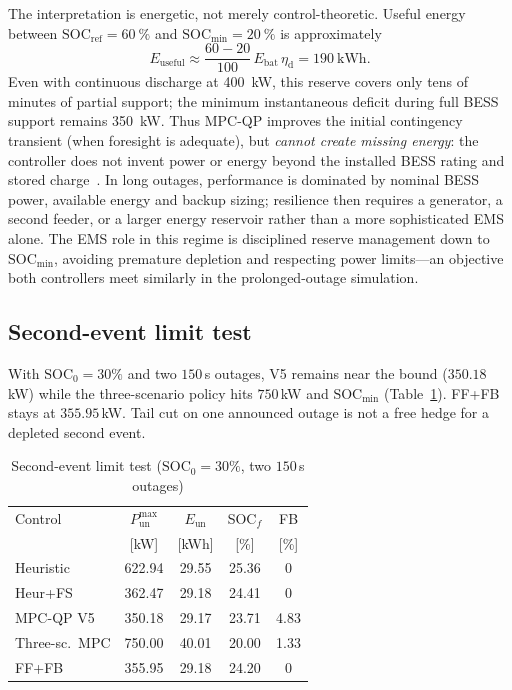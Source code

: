 \documentclass{ieeeaccess}
\begin{document}
The interpretation is energetic, not merely control-theoretic. Useful energy between $\mathrm{SOC}_{\mathrm{ref}}=\SI{60}{\percent}$ and $\mathrm{SOC}_{\min}=\SI{20}{\percent}$ is approximately
\begin{equation}
E_{\mathrm{useful}}\approx\frac{60-20}{100}\,E_{\mathrm{bat}}\,\eta_{\mathrm{d}}
=\SI{190}{\kilo\watt\hour}.
\end{equation}
Even with continuous discharge at \SI{400}{\kilo\watt}, this reserve covers only tens of minutes of partial support; the minimum instantaneous deficit during full BESS support remains \SI{350}{\kilo\watt}. Thus MPC-QP improves the initial contingency transient (when foresight is adequate), but \emph{cannot create missing energy}: the controller does not invent power or energy beyond the installed BESS rating and stored charge~\cite{zhao2023bess,aghmadi2024ess,zhang2024reliability}. In long outages, performance is dominated by nominal BESS power, available energy and backup sizing; resilience then requires a generator, a second feeder, or a larger energy reservoir rather than a more sophisticated EMS alone. The EMS role in this regime is disciplined reserve management down to $\mathrm{SOC}_{\min}$, avoiding premature depletion and respecting power limits---an objective both controllers meet similarly in the prolonged-outage simulation.

\subsection{Second-event limit test}
\label{sec:second}
With $\mathrm{SOC}_0=30\%$ and two $150$\,s outages, V5 remains near the bound ($350.18$\,kW) while the three-scenario policy hits $750$\,kW and $\mathrm{SOC}_{\min}$ (Table~\ref{tab:second}). FF+FB stays at $355.95$\,kW. Tail cut on one announced outage is not a free hedge for a depleted second event.

\begin{table}[!t]
\centering
\caption{Second-event limit test ($\mathrm{SOC}_0=30\%$, two $150$\,s outages)}
\label{tab:second}
{\footnotesize\setlength{\tabcolsep}{2.6pt}%
\begin{tabular}{@{}lcccc@{}}
\toprule
Control & $P_{\mathrm{un}}^{\max}$ & $E_{\mathrm{un}}$ & SOC$_f$ & FB \\
 & [kW] & [kWh] & [\%] & [\%] \\
\midrule
Heuristic & 622.94 & 29.55 & 25.36 & 0 \\
Heur+FS & 362.47 & 29.18 & 24.41 & 0 \\
MPC-QP V5 & 350.18 & 29.17 & 23.71 & 4.83 \\
Three-sc.\ MPC & 750.00 & 40.01 & 20.00 & 1.33 \\
FF+FB & 355.95 & 29.18 & 24.20 & 0 \\
\bottomrule
\end{tabular}}
\end{table}
\end{document}
